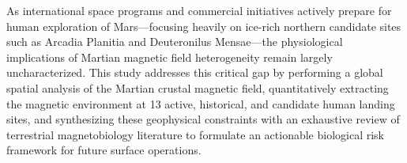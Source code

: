 As international space programs and commercial initiatives actively prepare for human exploration of Mars—focusing heavily on ice-rich northern candidate sites such as Arcadia Planitia and Deuteronilus Mensae—the physiological implications of Martian magnetic field heterogeneity remain largely uncharacterized. This study addresses this critical gap by performing a global spatial analysis of the Martian crustal magnetic field, quantitatively extracting the magnetic environment at 13 active, historical, and candidate human landing sites, and synthesizing these geophysical constraints with an exhaustive review of terrestrial magnetobiology literature to formulate an actionable biological risk framework for future surface operations.
